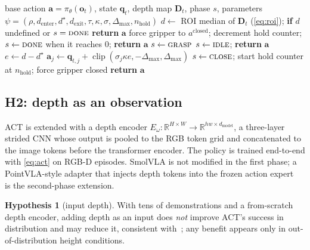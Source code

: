 \documentclass[11pt,a4paper]{article}
\theoremstyle{definition}
\newtheorem{hypothesis}{Hypothesis}
\newcommand{\obs}{\bm{o}}
\newcommand{\act}{\bm{a}}
\newcommand{\state}{\bm{q}}
\newcommand{\depthmap}{\bm{D}}
\newcommand{\pol}{\pi_\theta}
\newcommand{\R}{\mathbb{R}}
\begin{document}
\begin{algorithm}[t]
\caption{Depth-gated override, one control step (as implemented in \texttt{depth\_grasp.py})}
\label{alg:override}
\begin{algorithmic}[1]
\Require base action $\act=\pol(\obs_t)$, state $\state_t$, depth map $\depthmap_t$, phase $s$, parameters $\psi=(\rho,d_{\mathrm{enter}},d^\star,d_{\mathrm{exit}},\tau,\kappa,\sigma,\Delta_{\max},n_{\mathrm{hold}})$
\State $d \gets$ ROI median of $\depthmap_t$ (\cref{eq:roi}); \textbf{if} $d$ undefined or $s=\textsc{done}$ \textbf{return} $\act$ 
 force gripper to $a^{\mathrm{closed}}$; decrement hold counter; $s\gets\textsc{done}$ when it reaches 0; \textbf{return} $\act$ \EndIf
{} $s\gets\textsc{grasp}$ \EndIf
{} $s\gets\textsc{idle}$; \textbf{return} $\act$ \EndIf
{}
  \State $e\gets d-d^\star$
   $\act_j \gets \state_{t,j} + \operatorname{clip}(\sigma_j\kappa e,-\Delta_{\max},\Delta_{\max})$ \EndFor
   $s\gets\textsc{close}$; start hold counter at $n_{\mathrm{hold}}$; force gripper closed \EndIf
\EndIf
\State \textbf{return} $\act$
\end{algorithmic}
\end{algorithm}

\subsection{H2: depth as an observation}

ACT is extended with a depth encoder $E_\omega:\R^{H\times W}\to\R^{h w\times d_{\mathrm{model}}}$, a three-layer strided CNN whose output is pooled to the RGB token grid and concatenated to the image tokens before the transformer encoder. The policy is trained end-to-end with \cref{eq:act} on RGB-D episodes. SmolVLA is not modified in the first phase; a PointVLA-style adapter that injects depth tokens into the frozen action expert~\citep{li2025pointvla} is the second-phase extension.

\begin{hypothesis}[input depth]\label{hyp:h2}
With tens of demonstrations and a from-scratch depth encoder, adding depth as an input does \emph{not} improve ACT's success in distribution and may reduce it, consistent with~\citep{ze2024dp3}; any benefit appears only in out-of-distribution height conditions.
\end{hypothesis}
\end{document}
